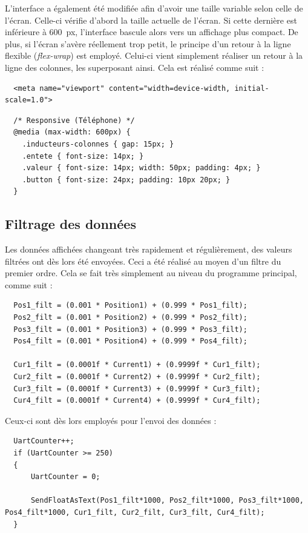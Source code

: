 L'interface a également été modifiée afin d'avoir une taille variable selon celle de l'écran. Celle-ci vérifie d'abord la taille actuelle de l'écran. Si cette dernière est inférieure à 600~px, l'interface bascule alors vers un affichage plus compact. De plus, si l'écran s'avère réellement trop petit, le principe d'un retour à la ligne flexible (\textit{flex-wrap}) est employé. Celui-ci vient simplement réaliser un retour à la ligne des colonnes, les superposant ainsi. Cela est réalisé comme suit :

\begin{verbatim}
  <meta name="viewport" content="width=device-width, initial-scale=1.0">
\end{verbatim}

\begin{verbatim}
  /* Responsive (Téléphone) */
  @media (max-width: 600px) {
    .inducteurs-colonnes { gap: 15px; }
    .entete { font-size: 14px; }
    .valeur { font-size: 14px; width: 50px; padding: 4px; }
    .button { font-size: 24px; padding: 10px 20px; }
  }
\end{verbatim}

\subsection{Filtrage des données}
Les données affichées changeant très rapidement et régulièrement, des valeurs filtrées ont dès lors été envoyées. Ceci a été réalisé au moyen d'un filtre du premier ordre. Cela se fait très simplement au niveau du programme principal, comme suit :

\begin{verbatim}
  Pos1_filt = (0.001 * Position1) + (0.999 * Pos1_filt);
  Pos2_filt = (0.001 * Position2) + (0.999 * Pos2_filt);
  Pos3_filt = (0.001 * Position3) + (0.999 * Pos3_filt);
  Pos4_filt = (0.001 * Position4) + (0.999 * Pos4_filt);

  Cur1_filt = (0.0001f * Current1) + (0.9999f * Cur1_filt);
  Cur2_filt = (0.0001f * Current2) + (0.9999f * Cur2_filt);
  Cur3_filt = (0.0001f * Current3) + (0.9999f * Cur3_filt);
  Cur4_filt = (0.0001f * Current4) + (0.9999f * Cur4_filt);
\end{verbatim}

Ceux-ci sont dès lors employés pour l'envoi des données :

\begin{verbatim}
  UartCounter++;
  if (UartCounter >= 250)
  {
      UartCounter = 0;

      SendFloatAsText(Pos1_filt*1000, Pos2_filt*1000, Pos3_filt*1000, Pos4_filt*1000, Cur1_filt, Cur2_filt, Cur3_filt, Cur4_filt);
  }
\end{verbatim}

